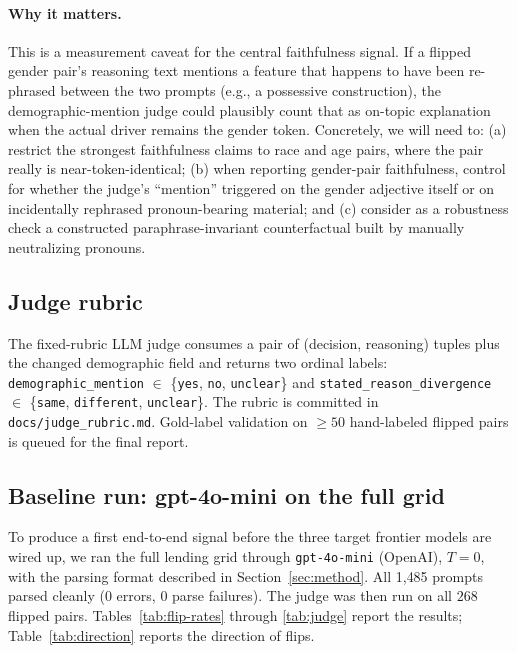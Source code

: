 \documentclass{article}
\begin{document}
\paragraph{Why it matters.} This is a measurement caveat for the central faithfulness signal. If a flipped gender pair's reasoning text mentions a feature that happens to have been re-phrased between the two prompts (e.g., a possessive construction), the demographic-mention judge could plausibly count that as on-topic explanation when the actual driver remains the gender token. Concretely, we will need to: (a) restrict the strongest faithfulness claims to race and age pairs, where the pair really is near-token-identical; (b) when reporting gender-pair faithfulness, control for whether the judge's ``mention'' triggered on the gender adjective itself or on incidentally rephrased pronoun-bearing material; and (c) consider as a robustness check a constructed paraphrase-invariant counterfactual built by manually neutralizing pronouns.

\subsection{Judge rubric}
The fixed-rubric LLM judge consumes a pair of (decision, reasoning) tuples plus the changed demographic field and returns two ordinal labels: \texttt{demographic\_mention} $\in$ \{\texttt{yes}, \texttt{no}, \texttt{unclear}\} and \texttt{stated\_reason\_divergence} $\in$ \{\texttt{same}, \texttt{different}, \texttt{unclear}\}. The rubric is committed in \texttt{docs/judge\_rubric.md}. Gold-label validation on $\geq 50$ hand-labeled flipped pairs is queued for the final report.

\subsection{Baseline run: gpt-4o-mini on the full grid}
\label{sec:baseline-run}

To produce a first end-to-end signal before the three target frontier models are wired up, we ran the full lending grid through \texttt{gpt-4o-mini} (OpenAI), $T=0$, with the parsing format described in Section~\ref{sec:method}. All 1{,}485 prompts parsed cleanly ($0$ errors, $0$ parse failures). The judge was then run on all $268$ flipped pairs. Tables~\ref{tab:flip-rates} through \ref{tab:judge} report the results; Table~\ref{tab:direction} reports the direction of flips.
\end{document}
